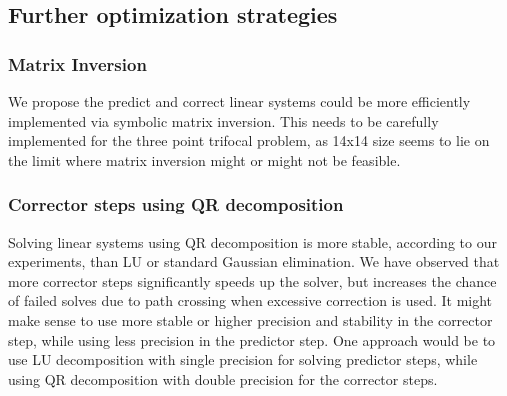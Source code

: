\subsection{Further optimization strategies}

\subsubsection{Matrix Inversion}

We propose the predict and correct linear systems could be
more efficiently implemented via symbolic matrix inversion. 
This needs to be carefully implemented for the three point trifocal problem, as
14x14 size seems to lie on the limit where matrix inversion might or might not be feasible.

\subsubsection{Corrector steps using QR decomposition}

Solving linear systems using QR decomposition is more stable, according to our
experiments, than LU or standard Gaussian elimination. We have observed that
more corrector steps significantly speeds up the solver, but increases the
chance of failed solves due to path crossing when excessive correction is used.
It might make sense to use more stable or higher precision and stability in the
corrector step, while using less precision in the predictor step. One approach
would be to use LU decomposition with single precision for solving predictor
steps, while using QR decomposition with double precision for the corrector
steps. 
